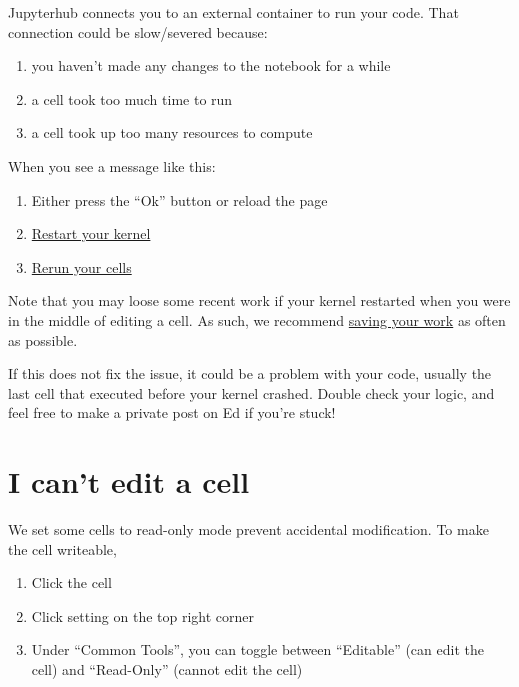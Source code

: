 \documentclass[
  letterpaper,
  DIV=11,
  numbers=noendperiod]{scrreprt}
\providecommand{\tightlist}{%
  \setlength{\itemsep}{0pt}\setlength{\parskip}{0pt}}\usepackage{longtable,booktabs,array}
\begin{document}
Jupyterhub connects you to an external container to run your code. That
connection could be slow/severed because:

\begin{enumerate}
\def\labelenumi{\arabic{enumi}.}
\tightlist
\item
  you haven't made any changes to the notebook for a while
\item
  a cell took too much time to run
\item
  a cell took up too many resources to compute
\end{enumerate}

When you see a message like this:

\begin{enumerate}
\def\labelenumi{\arabic{enumi}.}
\tightlist
\item
  Either press the ``Ok'' button or reload the page
\item
  \href{https://ds100.org/debugging-guide/jupyter101/jupyter101.html\#restarting-kernel}{Restart
  your kernel}
\item
  \href{https://ds100.org/debugging-guide/jupyter101/jupyter101.html\#running-cells}{Rerun
  your cells}
\end{enumerate}

Note that you may loose some recent work if your kernel restarted when
you were in the middle of editing a cell. As such, we recommend
\href{https://ds100.org/debugging-guide/jupyter101/jupyter101.html\#saving-your-notebook}{saving
your work} as often as possible.

If this does not fix the issue, it could be a problem with your code,
usually the last cell that executed before your kernel crashed. Double
check your logic, and feel free to make a private post on Ed if you're
stuck!

\section{I can't edit a cell}\label{i-cant-edit-a-cell}

We set some cells to read-only mode prevent accidental modification. To
make the cell writeable,

\begin{enumerate}
\def\labelenumi{\arabic{enumi}.}
\tightlist
\item
  Click the cell
\item
  Click setting on the top right corner
\item
  Under ``Common Tools'', you can toggle between ``Editable'' (can edit
  the cell) and ``Read-Only'' (cannot edit the cell)
\end{enumerate}
\end{document}
